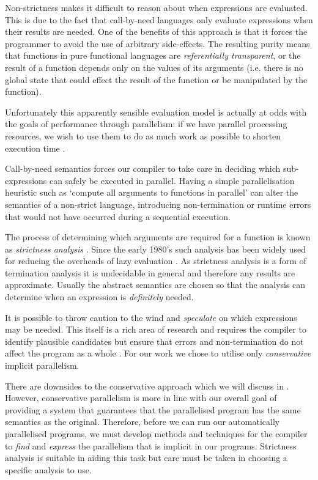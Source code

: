 Non-strictness makes it difficult to reason about when expressions are
evaluated. This is due to the fact that call-by-need languages only evaluate
expressions when their results are needed. One of the benefits of this
approach is that it forces the programmer to avoid the use of arbitrary
side-effects. The resulting purity means that functions in pure functional
languages are \emph{referentially transparent}, or the result of a function
depends only on the values of its arguments (i.e.  there is no global state
that could effect the result of the function or be manipulated by the
function).

Unfortunately this apparently sensible evaluation model is actually at odds
with the goals of performance through parallelism: if we have parallel
processing resources, we wish to use them to do as much work as possible to
shorten execution time \citep{tremblay1995impact}.

Call-by-need semantics forces our compiler to take care in deciding which
sub-expressions can safely be executed in parallel. Having a simple
parallelisation heuristic such as `compute all arguments to functions in
parallel' can alter the semantics of a non-strict language, introducing
non-termination or runtime errors that would not have occurred during a
sequential execution.

The process of determining which arguments are required for a function is known
as \emph{strictness analysis} \citep{mycroft1980theory}. Since the early 1980's
such analysis has been widely used for reducing the overheads of lazy evaluation
\citep{SergeyDemand}. As strictness analysis is a form of termination analysis
it is undecidable in general and therefore any results are approximate. Usually
the abstract semantics are chosen so that the analysis can determine when
an expression is \emph{definitely} needed.

It is possible to throw caution to the wind and \emph{speculate} on which
expressions may be needed. This itself is a rich area of research and requires
the compiler to identify plausible candidates but ensure that errors and
non-termination do not affect the program as a whole . For our work we chose to utilise only \emph{conservative}
implicit parallelism.


There are downsides to the conservative approach which we will discuss in
. However, conservative parallelism is more in
line with our overall goal of providing a system that guarantees that the
parallelised program has the same semantics as the original. Therefore, before
we can run our automatically parallelised programs, we must develop methods and
techniques for the compiler to \emph{find} and \emph{express} the parallelism
that is implicit in our programs. Strictness analysis is suitable in aiding
this task but care must be taken in choosing a specific analysis to use.

